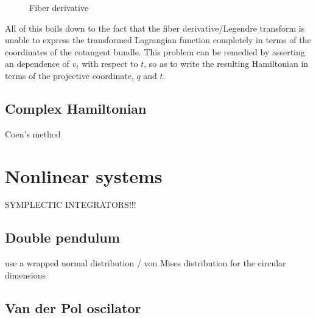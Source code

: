 \begin{figure}[h]
    \centering
    
    \label{fig:fiber_derivative}
    \caption{Fiber derivative}
\end{figure}
All of this boils down to the fact that the fiber derivative/Legendre transform is unable to express the transformed Lagrangian function completely in terms of the coordinates of the cotangent bundle. This problem can be remedied by asserting an dependence of $v_t$ with respect to $t$, so as to write the resulting Hamiltonian in terms of the projective coordinate, $q$ and $t$. 

\subsection{Complex Hamiltonian}
Coen's method

\section{Nonlinear systems}
SYMPLECTIC INTEGRATORS!!!
\subsection{Double pendulum}
use a wrapped normal distribution / von Mises distribution for the circular dimensions


\subsection{Van der Pol oscilator}

